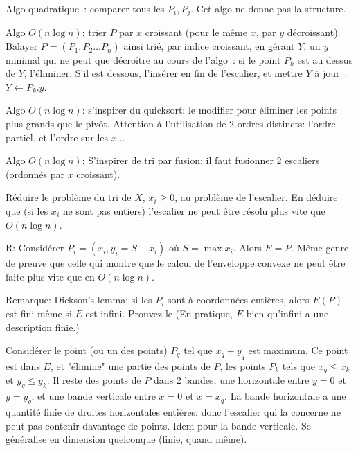 \documentclass[a4paper]{article}
\begin{document}
\newpage

Algo quadratique~: comparer tous les $P_i, P_j$. Cet algo ne donne pas la structure.

Algo $O(n\log n)$: trier $P$ par $x$ croissant (pour le m\^eme $x$, par $y$ d\'ecroissant). Balayer $P=(P_1, P_2\ldots P_n)$ ainsi tri\'e, par indice croissant,
en g\'erant $Y$, un $y$ minimal qui ne peut que d\'ecro\^itre
au cours de l'algo~: si le point $P_k$ est au dessus de $Y$, l'\'eliminer. S'il est dessous, l'ins\'erer en fin de l'escalier, et mettre $Y$ \`a jour~: $Y\leftarrow P_k.y$.

Algo $O(n\log n)$: s'inspirer du quicksort: le modifier pour \'eliminer les points plus grands que le piv\^ot.
Attention \`a l'utilisation de 2 ordres distincts: l'ordre partiel, et l'ordre sur les $x$...

Algo $O(n\log n)$: S'inspirer de tri par fusion: il faut fusionner 2 escaliers (ordonn\'es par $x$ croissant).

R\'eduire le probl\`eme du tri de $X$, $x_i \ge 0$, au probl\`eme de l'escalier. 
En d\'eduire que (si les $x_i$ ne sont pas entiers)
l'escalier ne peut \^etre r\'esolu plus vite que $O(n\log n)$.

R: Consid\'erer $P_i=(x_i, y_i = S- x_i)$ o\`u $S=  \max x_i$. Alors $E=P$.
M\^eme genre de preuve que celle qui montre que le calcul de l'enveloppe convexe ne peut \^etre faite plus vite que en $O(n\log n)$.

Remarque: Dickson's lemma: si les $P_i$ sont \`a coordonn\'ees enti\`eres, alors $E(P)$ est fini m\^eme si $E$ est infini. Prouvez le
(En pratique, $E$ bien qu'infini a une description finie.)

Consid\'erer le point (ou un des points) $P_q$ tel que $x_q+y_q$ est maximum. Ce point est dans $E$, et 
"\'elimine" une partie des points de $P$, les points $P_k$ tels que $x_q \le x_k$ et $y_q \le y_k$. 
Il reste des points de $P$ dans 2 bandes, une horizontale entre $y=0 $ et $y=y_q$, et une bande verticale
entre $x=0$ et $x=x_q$.
La bande horizontale a une quantit\'e finie de droites  horizontales enti\`eres: donc l'escalier qui la concerne
ne peut pas contenir davantage de points. Idem pour la bande verticale.
Se g\'en\'eralise en dimension quelconque (finie, quand m\^eme).
\end{document}
